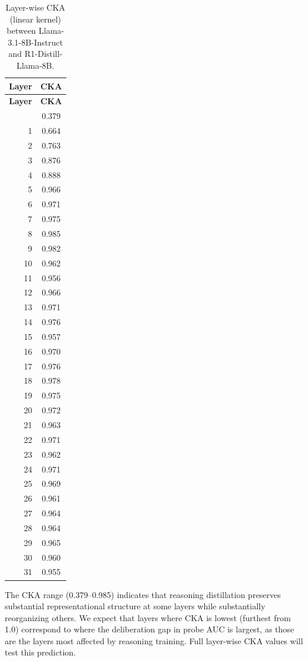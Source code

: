 \documentclass{article}
\begin{document}
\begin{longtable}{rc}
\caption{Layer-wise CKA (linear kernel) between Llama-3.1-8B-Instruct
  and R1-Distill-Llama-8B.}
\label{tab:cka_layers} \\
\toprule
\textbf{Layer} & \textbf{CKA} \\
\midrule
\endfirsthead
\toprule
\textbf{Layer} & \textbf{CKA} \\
\midrule
\endhead
\bottomrule
\endfoot
 0 & 0.379 \\
 1 & 0.664 \\
 2 & 0.763 \\
 3 & 0.876 \\
 4 & 0.888 \\
 5 & 0.966 \\
 6 & 0.971 \\
 7 & 0.975 \\
 8 & 0.985 \\
 9 & 0.982 \\
10 & 0.962 \\
11 & 0.956 \\
12 & 0.966 \\
13 & 0.971 \\
14 & 0.976 \\
15 & 0.957 \\
16 & 0.970 \\
17 & 0.976 \\
18 & 0.978 \\
19 & 0.975 \\
20 & 0.972 \\
21 & 0.963 \\
22 & 0.971 \\
23 & 0.962 \\
24 & 0.971 \\
25 & 0.969 \\
26 & 0.961 \\
27 & 0.964 \\
28 & 0.964 \\
29 & 0.965 \\
30 & 0.960 \\
31 & 0.955 \\
\end{longtable}

\noindent The CKA range (0.379--0.985) indicates that
reasoning distillation preserves substantial representational structure
at some layers while substantially reorganizing others.  We expect
that layers where CKA is lowest (furthest from 1.0) correspond to
where the deliberation gap in probe AUC is largest, as those are the
layers most affected by reasoning training.  Full layer-wise CKA
values will test this prediction.
\end{document}
